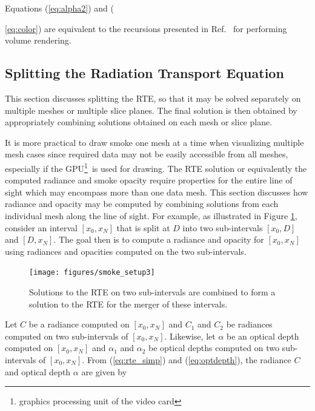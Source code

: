 Equations (\ref{eq:alpha2}) and ({\ref{eq:color}) are equivalent to the recursions presented in Ref.~\cite[Chapter 39]{gpugems} for performing volume rendering.


\subsection{Splitting the Radiation Transport Equation}
This section discusses splitting the RTE, so that it may be solved separately on multiple meshes or multiple slice planes.  The final solution is then obtained by  appropriately combining solutions obtained on each mesh or slice plane.

It is more practical to draw smoke one mesh at a time when visualizing multiple mesh cases since required data may not be easily accessible from all meshes, especially if the GPU\footnote{graphics processing unit of the video card}\ is used for drawing.  The RTE solution or equivalently the computed radiance and smoke opacity require  properties for the entire line of sight which may encompass more than one data mesh.  This section discusses how  radiance and opacity may be computed by combining solutions from each individual mesh along the line of sight.  For example, as illustrated in Figure \ref{figsmokesetup3}, consider an interval $[x_0,x_N]$ that is split at $D$ into two sub-intervals $[x_0,D]$ and $[D,x_N]$.  The goal then is to compute a radiance and opacity for $[x_0,x_N]$ using radiances and opacities computed on  the two sub-intervals.

\begin{figure}[\figoptions]
\begin{center}
\texttt{[image: figures/smoke\_setup3]}
\end{center}
\caption {Solutions to the RTE on two sub-intervals are combined to form a solution to the RTE
for the merger of these intervals.}
\label{figsmokesetup3}
\end{figure}

Let $C$ be a radiance computed on $[x_0,x_N]$ and $C_1$ and $C_2$ be radiances computed on two sub-intervals of $[x_0,x_N]$.  Likewise, let $\alpha$ be an optical depth computed on $[x_0,x_N]$ and $\alpha_1$ and $\alpha_2$ be optical depths computed on two sub-intervals of $[x_0,x_N]$.
From (\ref{eq:rte_simp}) and (\ref{eq:optdepth}), the radiance $C$ and optical depth $\alpha$ are given by

}
